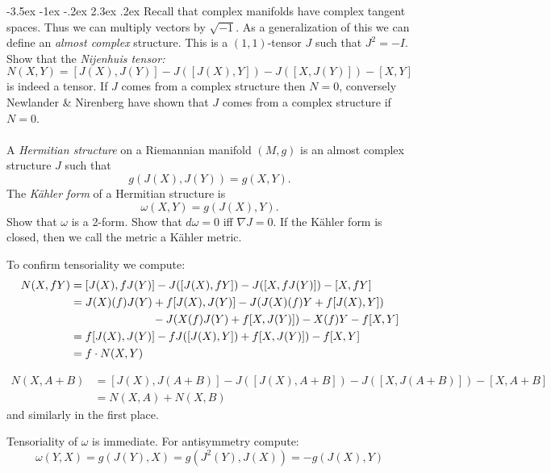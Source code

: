 \documentclass[10pt]{article}
\makeatletter
\renewcommand\section{\@startsection{section}{1}{\z@}%
                                  {-3.5ex \@plus -1ex \@minus -.2ex}%
                                  {2.3ex \@plus.2ex}%
                                  {\normalfont\large\bfseries}}
\makeatother
\begin{document}
\section{Recall that complex manifolds have complex tangent spaces. Thus we can multiply vectors by $\sqrt {-1}$. As a generalization of this we can define an \emph{almost complex} structure. This is a $(1,1)$-tensor $J$ such that $J^2 =-I$. Show that the \emph{Nijenhuis tensor:} $$N(X,Y) = [J(X), J(Y)] - J([J(X),Y])- J([X,J(Y)]) - [X,Y]$$ is indeed a tensor. If $J$ comes from a complex structure then $N=0$, conversely Newlander \& Nirenberg have shown that $J$ comes from a complex structure if $N=0$.\\\\A \emph{Hermitian  structure} on a Riemannian manifold $(M,g)$ is an almost complex structure $J$ such that $$g(J(X), J(Y)) = g(X,Y).$$ The \emph{K\"ahler form} of a Hermitian structure is $$\omega(X,Y) = g(J(X),Y).$$ Show that $\omega$ is a 2-form. Show that $d \omega =0$ iff $\nabla J=0$. If the K\"ahler form is closed, then we call the metric a K\"ahler metric.}

To confirm tensoriality we compute:
\begin{align*}
	N(X,f Y) &= [J(X), f J(Y)] - J([J(X),f Y])- J([X,f J(Y)]) - [X,f Y]\\
	&=J(X)(f) J(Y)  + f [J(X), J(Y)]  - J( J(X)(f)Y + f[J(X),Y]) \\
	& \hspace{2.55cm}- J(X(f)J(Y) +f[X, J(Y)]) -X(f)Y -  f[X, Y]\\
	&= f [J(X), J(Y)]  - f J([J(X),Y])  +f[X, J(Y)])  -  f[X, Y]\\
	&= f \cdot  N(X,Y)
\end{align*}

\begin{align*}
	N(X,A+ B) &= [J(X),  J(A+B)] - J([J(X),A+B])- J([X,J(A+B)]) - [X,A+B] \\
	&= N(X,A)+N(X,B)
\end{align*}
and similarly in the first place.

Tensoriality of $\omega$ is immediate. For antisymmetry compute:
\[\omega(Y,X) = g(J(Y),X) = g(J^2(Y), J(X)) = -g(J(X), Y)\]
\end{document}
